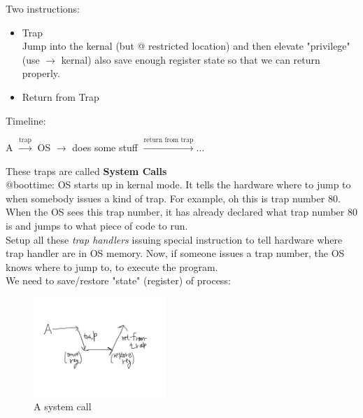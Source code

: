 Two instructions:

\begin{itemize}
    \item Trap\\
        Jump into the kernal (but @ restricted location) and then
        elevate "privilege" (use $\rightarrow$ kernal) also save
        enough register state so that we can return properly.
    \item Return from Trap
\end{itemize}

Timeline:\\

\begin{center}
    A $\xrightarrow{\text{trap}}$ OS $\rightarrow$ does some stuff
    $\xrightarrow{\text{return from trap}} \dots$ 
\end{center}

These traps are called \textbf{System Calls}\\

@boottime: OS starts up in kernal mode. It tells the hardware where
to jump to when somebody issues a kind of trap. For example, oh this
is trap number 80. When the OS sees this trap number, it has already
declared what trap number 80 is and jumps to what piece of code to
run.\\

Setup all these \textit{trap handlers}
issuing special instruction to tell hardware where trap handler
are in OS memory. Now, if someone issues a trap number, the OS
knows where to jump to, to execute the program.\\

We need to save/restore "state" (register) of process:\\

\begin{figure}[h!]
    \begin{center}
        \includegraphics[width=5cm]{img/systemcall.png}
        \caption{A system call}
    \end{center}
\end{figure}

